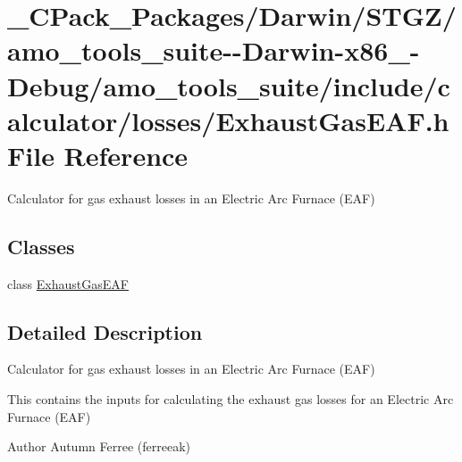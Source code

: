 \hypertarget{___c_pack___packages_2_darwin_2_s_t_g_z_2amo__tools__suite--_darwin-x86__64-_debug_2amo__tools__0f30d1efd90dbfde8cea798e9254f03b}{}\section{\+\_\+\+C\+Pack\+\_\+\+Packages/\+Darwin/\+S\+T\+G\+Z/amo\+\_\+tools\+\_\+suite-\/-\/\+Darwin-\/x86\+\_-\/\+Debug/amo\+\_\+tools\+\_\+suite/include/calculator/losses/\+Exhaust\+Gas\+E\+AF.h File Reference}
\label{___c_pack___packages_2_darwin_2_s_t_g_z_2amo__tools__suite--_darwin-x86__64-_debug_2amo__tools__0f30d1efd90dbfde8cea798e9254f03b}


Calculator for gas exhaust losses in an Electric Arc Furnace (E\+AF)  


\subsection*{Classes}
\begin{DoxyCompactItemize}
\item 
class \hyperlink{class_exhaust_gas_e_a_f}{Exhaust\+Gas\+E\+AF}
\end{DoxyCompactItemize}


\subsection{Detailed Description}
Calculator for gas exhaust losses in an Electric Arc Furnace (E\+AF) 

This contains the inputs for calculating the exhaust gas losses for an Electric Arc Furnace (E\+AF)

\begin{DoxyAuthor}{Author}
Autumn Ferree (ferreeak) 
\end{DoxyAuthor}
